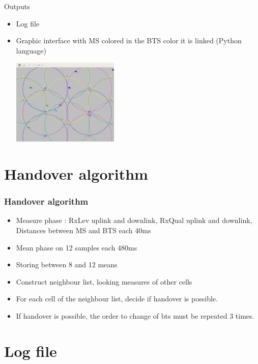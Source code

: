 \documentclass{beamer}
\begin{document}
\begin{frame}
Outputs\\

\begin{itemize}
    \item Log file
    \item Graphic interface with MS colored in the BTS color it is linked
(Python language)
      \begin{center}
        \includegraphics[width=0.4\textwidth]{./images/capture.png}
      \end{center}
\end{itemize}

\end{frame}

\section{Handover algorithm}

\begin{frame}
\frametitle{Handover algorithm}
\begin{itemize}
  \item Measure phase : RxLev uplink and downlink, RxQual uplink and downlink, Distances between MS and BTS each 40ms
  \item Mean phase on 12 samples each 480ms
  \item Storing between 8 and 12 means
  \item Construct neighbour list, looking measures of other cells
  \item For each cell of the neighbour list, decide if handover is possible.
  \item If handover is possible, the order to change of bts must be repeated 3
times.
\end{itemize}
\end{frame}
\section{Log file}
\end{document}
